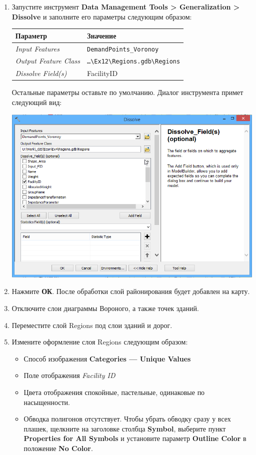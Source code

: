 \documentclass[]{book}
\theoremstyle{definition}
\theoremstyle{definition}
\theoremstyle{definition}
\theoremstyle{remark}
\begin{document}
\begin{enumerate}
\def\labelenumi{\arabic{enumi}.}
\item
  Запустите инструмент \textbf{Data Management Tools \textgreater{}
  Generalization \textgreater{} Dissolve} и заполните его параметры
  следующим образом:

  \begin{longtable}[]{@{}ll@{}}
  \toprule
  Параметр & Значение\tabularnewline
  \midrule
  \endhead
  \emph{Input Features} & \texttt{DemandPoints\_Voronoy}\tabularnewline
  \emph{Output Feature Class} &
  \texttt{\ldots{}\textbackslash{}Ex12\textbackslash{}Regions.gdb\textbackslash{}Regions}\tabularnewline
  \emph{Dissolve Field(s)} & FacilityID\tabularnewline
  \bottomrule
  \end{longtable}

  Остальные параметры оставьте по умолчанию. Диалог инструмента примет
  следующий вид:

  \includegraphics{images/Ex12/image31.png}
\item
  Нажмите \textbf{ОК}. После обработки слой районирования будет добавлен
  на карту.
\item
  Отключите слои диаграммы Вороного, а также точек зданий.
\item
  Переместите слой Regions под слои зданий и дорог.
\item
  Измените оформление слоя Regions следующим образом:

  \begin{itemize}
  \item
    Способ изображения \textbf{Categories --- Unique Values}
  \item
    Поле отображения \emph{Facility ID}
  \item
    Цвета отображения спокойные, пастельные, одинаковые по насыщенности.
  \item
    Обводка полигонов отсутствует. Чтобы убрать обводку сразу у всех
    плашек, щелкните на заголовке столбца \textbf{Symbol}, выберите
    пункт \textbf{Properties for All Symbols} и установите параметр
    \textbf{Outline Color} в положение \textbf{No Color}.
  \end{itemize}


\end{enumerate}
\end{document}
